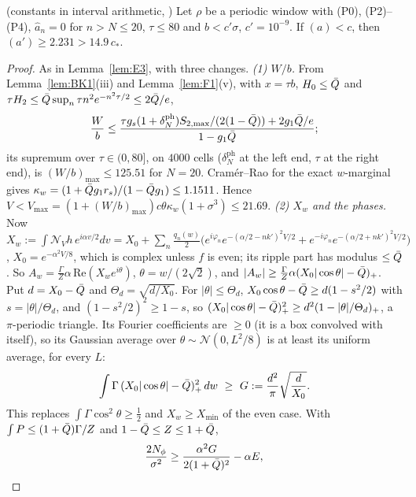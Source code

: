 \begin{lemma} \proofst{} (constants in interval arithmetic, )
\label{lem:F4}
Let $\rho$ be a periodic window with (P0), (P2)--(P4), $\hat a_n=0$ for $n>N\le20$, $\tau\le80$ and $b<c'\sigma$, $c'=10^{-9}$. If $(a)<c$, then $(a')\ge2.231>14.9\,c_*$.
\end{lemma}
\begin{proof}
As in Lemma~\ref{lem:E3}, with three changes.
\emph{(1) $W/b$.} From Lemma~\ref{lem:BK1}(iii) and Lemma~\ref{lem:F1}(v), with $x=\tau b$, $H_0\le\bar Q$ and $\tau H_2\le\bar Q\sup_n\tau n^2e^{-n^2\tau/2}\le2\bar Q/e$,
\begin{equation*}
\frac Wb\le\frac{\tau g_s(1+\delta_N^{\mathrm{ph}})S_{2,\max}/(2(1-\bar Q))+2g_1\bar Q/e}{1-g_1\bar Q};
\end{equation*}
its supremum over $\tau\in(0,80]$, on $4000$ cells ($\delta_N^{\mathrm{ph}}$ at the left end, $\tau$ at the right end), is $(W/b)_{\max}\le125.51$ for $N=20$.
Cram\'er--Rao for the exact $w$-marginal gives $\kappa_w=(1+\bar Q g_1r_s)/(1-\bar Q g_1)\le1.1511$. Hence $V<V_{\max}=(1+(W/b)_{\max})c\theta\kappa_w(1+\sigma^3)\le21.69$.
\emph{(2) $X_w$ and the phases.} Now $X_w:=\int\mathcal N_Vh\,e^{i\alpha v/2}dv=X_0+\sum_n\frac{q_n(w)}2\big(e^{i\varphi_n}e^{-(\alpha/2-nk')^2V/2}+e^{-i\varphi_n}e^{-(\alpha/2+nk')^2V/2}\big)$,
$X_0=e^{-\alpha^2V/8}$, which is complex unless $f$ is even; its ripple part has modulus $\le\bar Q$. So $A_w=\frac\Gamma Z\alpha\,\mathrm{Re}(X_we^{i\theta})$, $\theta=w/(2\sqrt2)$, and
$|A_w|\ge\frac\Gamma Z\alpha(X_0|\cos\theta|-\bar Q)_+$. Put $d=X_0-\bar Q$ and $\Theta_d=\sqrt{d/X_0}$. For $|\theta|\le\Theta_d$, $X_0\cos\theta-\bar Q\ge d(1-s^2/2)$ with
$s=|\theta|/\Theta_d$, and $(1-s^2/2)^2\ge1-s$, so $(X_0|\cos\theta|-\bar Q)_+^2\ge d^2(1-|\theta|/\Theta_d)_+$, a $\pi$-periodic triangle. Its Fourier coefficients are
$\ge0$ (it is a box convolved with itself), so its Gaussian average over $\theta\sim\mathcal N(0,L^2/8)$ is at least its uniform average, for every $L$:
\begin{equation*}
\int\Gamma\,(X_0|\cos\theta|-\Qb)_+^2\,dw\ \ge\ G:=\frac{d^2}{\pi}\sqrt{\frac d{X_0}} .
\end{equation*}
This replaces $\int\Gamma\cos^2\theta\ge\frac12$ and $X_w\ge X_{\min}$ of the even case. With $\int P\le(1+\bar Q)\Gamma/Z$ and $1-\bar Q\le Z\le1+\bar Q$,
\begin{equation*}
\begin{aligned}
\frac{2N_\phi}{\sigma^2}&\ge\frac{\alpha^2G}{2(1+\Qb)^2}-\alpha E,\\

\end{aligned}
\end{equation*}
\end{proof}
